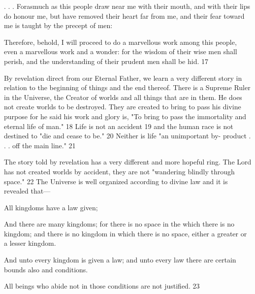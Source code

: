 . . . Forasmuch as this people draw near me with their mouth, and with their lips do honour
me, but have removed their heart far from me, and their fear toward me is taught by the
precept of men:

Therefore, behold, I will proceed to do a marvellous work among this people, even a
marvellous work and a wonder: for the wisdom of their wise men shall perish, and the
understanding of their prudent men shall be hid. 17

By revelation direct from our Eternal Father, we learn a very different story in relation to the
beginning of things and the end thereof. There is a Supreme Ruler in the Universe, the
Creator of worlds and all things that are in them. He does not create worlds to be destroyed.
They are created to bring to pass his divine purpose for he said his work and glory is, "To
bring to pass the immortality and eternal life of man." 18 Life is not an accident 19 and the
human race is not destined to "die and cease to be." 20 Neither is life "an unimportant by-
product . . . off the main line." 21

The story told by revelation has a very different and more hopeful ring. The Lord has not
created worlds by accident, they are not "wandering blindly through space." 22 The Universe
is well organized according to divine law and it is revealed that—

All kingdoms have a law given;

And there are many kingdoms; for there is no space in the which there is no kingdom; and
there is no kingdom in which there is no space, either a greater or a lesser kingdom.

And unto every kingdom is given a law; and unto every law there are certain bounds also and
conditions.

All beings who abide not in those conditions are not justified. 23

